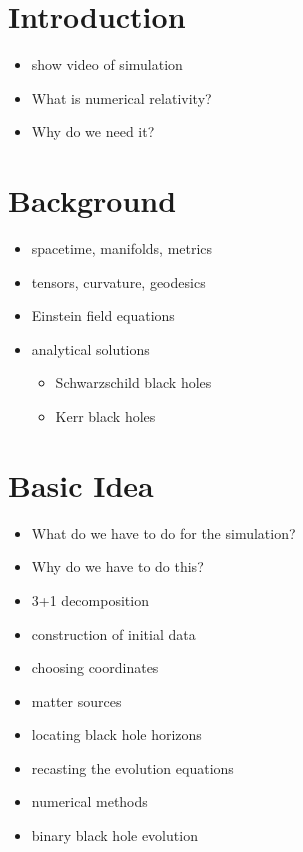 \documentclass[twocolumn]{article}
\begin{document}
  \medskip

  \section{Introduction} %
  \label{sec:introduction}
    \begin{itemize}
      \item show video of simulation
      \item What is numerical relativity?
      \item Why do we need it?
    \end{itemize}

  \section{Background} %
  \label{sec:background}
    \begin{itemize}
      \item spacetime, manifolds, metrics
      \item tensors, curvature, geodesics
      \item Einstein field equations
      \item analytical solutions
        \begin{itemize}
          \item Schwarzschild black holes
          \item Kerr black holes
        \end{itemize}
    \end{itemize}

  \section{Basic Idea} %
  \label{sec:basic_idea}
    \begin{itemize}
      \item What do we have to do for the simulation?
      \item Why do we have to do this?
    \end{itemize}
    \begin{itemize}
      \item 3+1 decomposition
      \item construction of initial data
      \item choosing coordinates
      \item matter sources
      \item locating black hole horizons
      \item recasting the evolution equations
      \item numerical methods
      \item binary black hole evolution
    \end{itemize}
\end{document}
